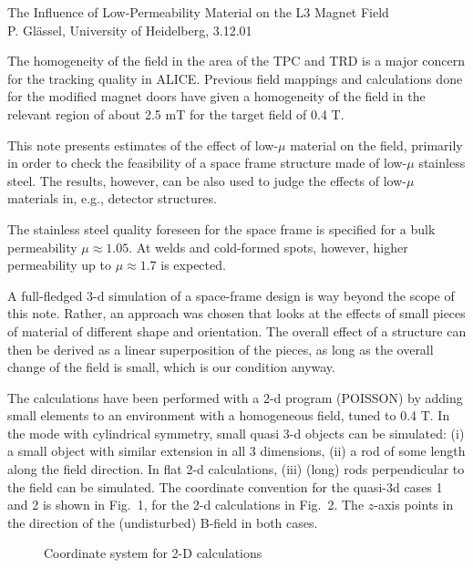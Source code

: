 \documentclass[12pt]{article}
\begin{document}
\begin{center}
{\Large The Influence of Low-Permeability Material on the L3 Magnet
Field}\\[10mm]

{P. Gl\"assel, University of Heidelberg, 3.12.01}\\[1mm]
\end{center}

The homogeneity of the field in the area of the TPC and TRD is a major
concern for the tracking quality in ALICE. Previous field mappings and
calculations done for the modified magnet doors have given a homogeneity
of the field in the relevant region of about 2.5 mT for the target field
of 0.4 T.

This note presents estimates of the effect of low-$\mu$ material on the
field, primarily in order to check the feasibility of a space frame
structure made of low-$\mu$ stainless steel. The results, however, can be
also used to judge the effects of low-$\mu$ materials in, e.g., detector
structures. 

The stainless steel quality foreseen for the space frame is specified
for a bulk permeability $\mu \approx 1.05$. At welds and cold-formed
spots, however, higher permeability up to $\mu \approx 1.7$ is expected.

A full-fledged 3-d simulation of a space-frame design is way beyond the
scope of this note. Rather, an approach was chosen that looks at the
effects of small pieces of material of different shape and orientation.
The overall effect of a structure can then be derived as a linear
superposition of the pieces, as long as the overall change of the field
is small, which is our condition anyway.

The calculations have been performed with a 2-d program (POISSON) by
adding small elements to an environment with a homogeneous field, tuned
to 0.4 T. In the mode with cylindrical symmetry, small quasi 3-d objects
can be simulated: (i) a small object with similar extension in all 3
dimensions, (ii) a rod of some length along the field direction.  In flat
2-d calculations, (iii) (long) rods perpendicular to the field  can be
simulated. The coordinate convention for the quasi-3d cases 1 and 2 is
shown in Fig.~1, for the 2-d calculations in Fig.~2. The $z$-axis
points in the direction of the (undisturbed) B-field in both cases.

\begin{figure}[bh]
\begin{center}
\parbox{130mm}{
\parbox{60mm}{
\begin{center}
\caption{Coordinate system for 3-D calculations}
\end{center}
}
\hfill
\parbox{60mm}{
\begin{center}
\caption{Coordinate system for 2-D calculations}
\end{center}
}
}
\end{center}
\end{figure}
\end{document}
